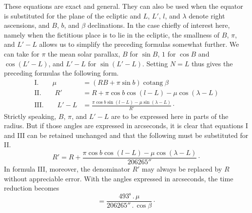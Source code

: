 These equations are exact and general. They can also be used when the equator is substituted for the plane of the ecliptic and $L$, $L'$, $l$, and $\lambda$ denote right ascensions, and $B$, $b$, and $\beta$ declinations. In the case chiefly of interest here, namely when the fictitious place is to lie in the ecliptic, the smallness of $B$, $\pi$, and $L'-L$ allows us to simplify the preceding formulas somewhat further. We can take for $\pi$ the mean solar parallax, $B$ for $\sin B$, $1$ for $\cos B$ and $\cos(L'-L)$, and $L'-L$ for $\sin(L'-L)$. Setting $N=L$ thus gives the preceding formulas the following form.
\[
\begin{aligned}
\mathrm{I.}\qquad \mu&=(RB+\pi\sin b)\operatorname{cotang}\beta\\
\mathrm{II.}\qquad R'&=R+\pi\cos b\cos(l-L)-\mu\cos(\lambda-L)\\
\mathrm{III.}\qquad L'-L&=\frac{\pi\cos b\sin(l-L)-\mu\sin(\lambda-L)}{R'}\mathpunct{\cdot}
\end{aligned}
\]
Strictly speaking, $B$, $\pi$, and $L'-L$ are to be expressed here in parts of the radius. But if those angles are expressed in arcseconds, it is clear that equations I and III can be retained unchanged and that the following must be substituted for II.
\[
R'=R+\frac{\pi\cos b\cos(l-L)-\mu\cos(\lambda-L)}{206265''}\mathpunct{\cdot}
\]
In formula III, moreover, the denominator $R'$ may always be replaced by $R$ without appreciable error. With the angles expressed in arcseconds, the time reduction becomes
\[
=\frac{493^{\mathrm{s}}\mathpunct{.}\mu}{206265''\mathpunct{.}\cos\beta}\mathpunct{\cdot}
\]

